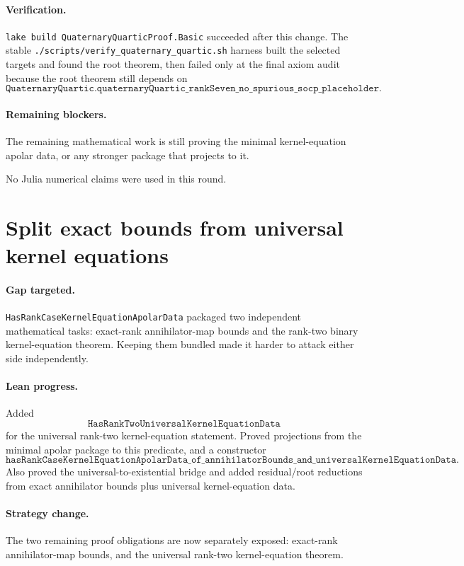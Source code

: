 \documentclass[11pt]{article}
\begin{document}
\paragraph{Verification.}
\texttt{lake build QuaternaryQuarticProof.Basic} succeeded after this change.
The stable \texttt{./scripts/verify\_quaternary\_quartic.sh} harness built the
selected targets and found the root theorem, then failed only at the final axiom
audit because the root theorem still depends on
\[
\texttt{QuaternaryQuartic.quaternaryQuartic\_rankSeven\_no\_spurious\_socp\_placeholder}.
\]

\paragraph{Remaining blockers.}
The remaining mathematical work is still proving the minimal
kernel-equation apolar data, or any stronger package that projects to it.

No Julia numerical claims were used in this round.

\section*{Split exact bounds from universal kernel equations}

\paragraph{Gap targeted.}
\texttt{HasRankCaseKernelEquationApolarData} packaged two independent
mathematical tasks: exact-rank annihilator-map bounds and the rank-two binary
kernel-equation theorem.  Keeping them bundled made it harder to attack either
side independently.

\paragraph{Lean progress.}
Added
\[
\texttt{HasRankTwoUniversalKernelEquationData}
\]
for the universal rank-two kernel-equation statement.  Proved projections from
the minimal apolar package to this predicate, and a constructor
\[
\texttt{hasRankCaseKernelEquationApolarData\_of\_annihilatorBounds\_and\_universalKernelEquationData}.
\]
Also proved the universal-to-existential bridge and added residual/root
reductions from exact annihilator bounds plus universal kernel-equation data.

\paragraph{Strategy change.}
The two remaining proof obligations are now separately exposed: exact-rank
annihilator-map bounds, and the universal rank-two kernel-equation theorem.
\end{document}
